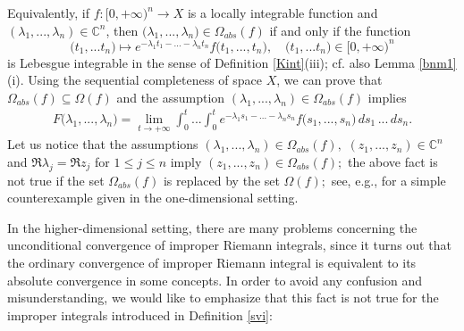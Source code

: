 \documentclass{amsart}
\theoremstyle{definition}
\theoremstyle{remark}
\numberwithin{equation}{section}
\begin{document}
Equivalently, if $f: [0,+\infty)^{n}\rightarrow X$ is a locally integrable function and $(\lambda_{1},...,\lambda_{n})\in {\mathbb C}^{n}$, then 
$(\lambda_{1},...,\lambda_{n}\bigr)\in \Omega_{abs}(f)$ if and only if the function 
$$
\bigl(t_{1},...t_{n}\bigr)\mapsto e^{-\lambda_{1}t_{1}-...-\lambda_{n}t_{n}}f\bigl(t_{1},...,t_{n}\bigr),\quad \bigl(t_{1},...t_{n}\bigr)\in [0,+\infty)^{n}
$$ 
is Lebesgue integrable in the sense of Definition \ref{Kint}(iii); cf. also Lemma \ref{bnm1}(i).
Using the sequential completeness of space $X$, we can prove that $\Omega_{abs}(f) \subseteq \Omega(f) $ and the assumption $(\lambda_{1},...,\lambda_{n})\in \Omega_{abs}(f)$ implies
\begin{align*} 
F\bigl(\lambda_{1},...,\lambda_{n}\bigr)=\lim_{t\rightarrow +\infty}\int^{t}_{0}...\int^{t}_{0}e^{-\lambda_{1}s_{1}-...-\lambda_{n}s_{n}}f\bigl(s_{1},...,s_{n}\bigr)\, ds_{1}\, ...\, ds_{n}.
\end{align*}
Let us notice that the assumptions $(\lambda_{1},...,\lambda_{n})\in \Omega_{abs}(f),$ $(z_{1},...,z_{n}) \in {\mathbb C}^{n}$ and $\Re \lambda_{j}=\Re z_{j}$ for $1\leq j \leq n$ imply $(z_{1},...,z_{n}) \in \Omega_{abs}(f);$ the above fact is not true if the set $\Omega_{abs}(f)$ is replaced by the set $\Omega(f);$ see, e.g., \cite[Example 1.4.2]{a43} for a simple counterexample given in the one-dimensional setting. 

In the higher-dimensional setting, there are many problems concerning the unconditional convergence of improper Riemann integrals, since it turns out that the ordinary convergence of improper Riemann integral is equivalent to its absolute convergence in some concepts. In order to avoid any confusion and misunderstanding, we would like to emphasize that this fact is not true for the improper integrals introduced in Definition \ref{svi}:
\end{document}
